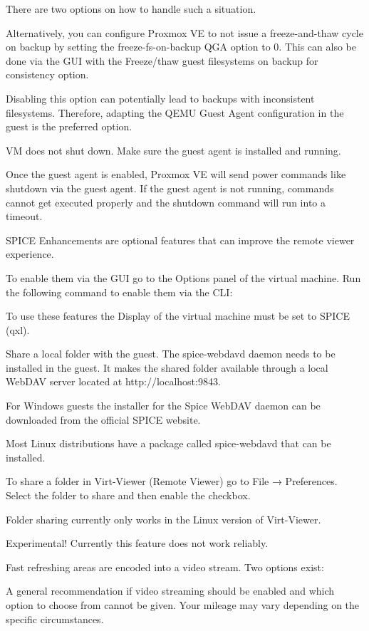 There are two options on how to handle such a situation.

Alternatively, you can configure Proxmox VE to not issue a freeze-and-thaw cycle on backup by setting the freeze-fs-on-backup QGA option to 0. This can also be done via the GUI with the Freeze/thaw guest filesystems on backup for consistency option.

Disabling this option can potentially lead to backups with inconsistent filesystems. Therefore, adapting the QEMU Guest Agent configuration in the guest is the preferred option.

VM does not shut down. Make sure the guest agent is installed and running.

Once the guest agent is enabled, Proxmox VE will send power commands like shutdown via the guest agent. If the guest agent is not running, commands cannot get executed properly and the shutdown command will run into a timeout.

SPICE Enhancements are optional features that can improve the remote viewer experience.

To enable them via the GUI go to the Options panel of the virtual machine. Run the following command to enable them via the CLI:

To use these features the Display of the virtual machine must be set to SPICE (qxl).

Share a local folder with the guest. The spice-webdavd daemon needs to be installed in the guest. It makes the shared folder available through a local WebDAV server located at http://localhost:9843.

For Windows guests the installer for the Spice WebDAV daemon can be downloaded from the official SPICE website.

Most Linux distributions have a package called spice-webdavd that can be installed.

To share a folder in Virt-Viewer (Remote Viewer) go to File → Preferences. Select the folder to share and then enable the checkbox.

Folder sharing currently only works in the Linux version of Virt-Viewer.

Experimental! Currently this feature does not work reliably.

Fast refreshing areas are encoded into a video stream. Two options exist:

A general recommendation if video streaming should be enabled and which option to choose from cannot be given. Your mileage may vary depending on the specific circumstances.


